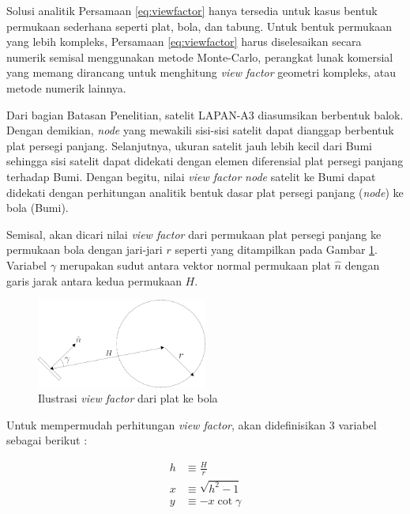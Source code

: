 Solusi analitik Persamaan \ref{eq:viewfactor} hanya tersedia
untuk kasus bentuk permukaan sederhana seperti plat, bola, dan tabung.
Untuk bentuk permukaan yang lebih kompleks, Persamaan
\ref{eq:viewfactor} harus diselesaikan secara numerik semisal
menggunakan metode Monte-Carlo, perangkat lunak komersial yang memang
dirancang untuk menghitung \textit{view factor} geometri kompleks,
atau metode numerik lainnya.

Dari bagian Batasan Penelitian, satelit LAPAN-A3 diasumsikan berbentuk
balok. Dengan demikian, \textit{node} yang mewakili sisi-sisi
satelit dapat dianggap berbentuk plat persegi panjang. Selanjutnya, ukuran
satelit jauh lebih kecil dari Bumi sehingga sisi satelit dapat didekati dengan
elemen diferensial plat persegi panjang terhadap Bumi. Dengan begitu, nilai
\textit{view factor} \textit{node} satelit ke Bumi dapat didekati
dengan perhitungan analitik bentuk dasar plat persegi panjang
(\textit{node}) ke bola (Bumi). 

Semisal, akan dicari nilai \textit{view factor} dari permukaan plat persegi
panjang ke permukaan bola dengan jari-jari $r$ seperti yang ditampilkan pada
Gambar \ref{fig:platball}. Variabel $\gamma$ merupakan sudut antara vektor
normal permukaan plat $\hat{n}$ dengan garis jarak antara kedua permukaan $H$.

\begin{figure}[!ht]
\setlength{}
\begin{center}
\includegraphics[width=0.5\textwidth]{fig/platball.png}
	\caption{Ilustrasi \textit{view factor} dari plat ke bola}
\label{fig:platball}
\end{center}
\end{figure}

Untuk mempermudah perhitungan \textit{view factor}, akan didefinisikan 3 variabel sebagai berikut :

\begin{equation}
\begin{split}
\label{eq:hxy}
	h &\equiv \frac{H}{r} \\
	x &\equiv \sqrt{h^2 - 1} \\
	y &\equiv -x \cot{\gamma}
\end{split}
\end{equation}

